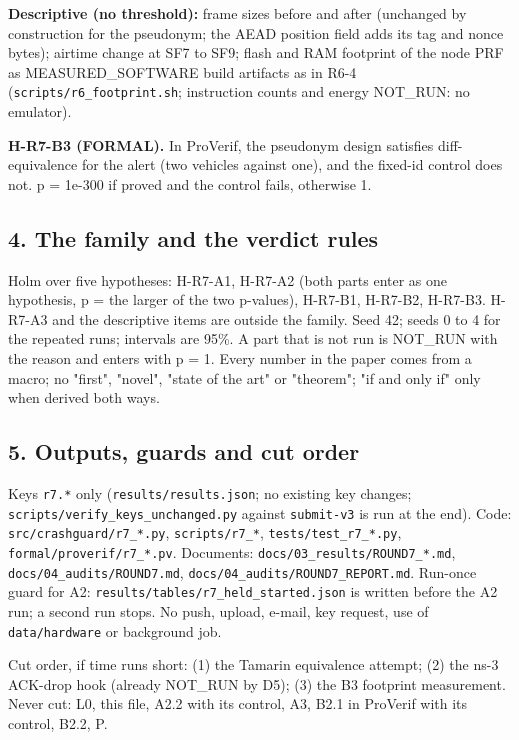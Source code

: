 \textbf{Descriptive (no threshold):} frame sizes before and after (unchanged by construction for the pseudonym; the AEAD position field adds its tag and nonce bytes); airtime change at SF7 to SF9; flash and RAM footprint of the node PRF as MEASURED\_SOFTWARE build artifacts as in R6-4 (\texttt{scripts/r6\_footprint.sh}; instruction counts and energy NOT\_RUN: no emulator).

\textbf{H-R7-B3 (FORMAL).} In ProVerif, the pseudonym design satisfies diff-equivalence for the alert (two vehicles against one), and the fixed-id control does not. p = 1e-300 if proved and the control fails, otherwise 1.

\subsection*{4. The family and the verdict rules}

Holm over five hypotheses: H-R7-A1, H-R7-A2 (both parts enter as one hypothesis, p = the larger of the two p-values), H-R7-B1, H-R7-B2, H-R7-B3. H-R7-A3 and the descriptive items are outside the family. Seed 42; seeds 0 to 4 for the repeated runs; intervals are 95\%. A part that is not run is NOT\_RUN with the reason and enters with p = 1. Every number in the paper comes from a macro; no "first", "novel", "state of the art" or "theorem"; "if and only if" only when derived both ways.

\subsection*{5. Outputs, guards and cut order}

Keys \texttt{r7.*} only (\texttt{results/results.json}; no existing key changes; \texttt{scripts/verify\_keys\_unchanged.py} against \texttt{submit-v3} is run at the end). Code: \texttt{src/crashguard/r7\_*.py}, \texttt{scripts/r7\_*}, \texttt{tests/test\_r7\_*.py}, \texttt{formal/proverif/r7\_*.pv}. Documents: \texttt{docs/03\_results/ROUND7\_*.md}, \texttt{docs/04\_audits/ROUND7.md}, \texttt{docs/04\_audits/ROUND7\_REPORT.md}. Run-once guard for A2: \texttt{results/tables/r7\_held\_started.json} is written before the A2 run; a second run stops. No push, upload, e-mail, key request, use of \texttt{data/hardware} or background job.

Cut order, if time runs short: (1) the Tamarin equivalence attempt; (2) the ns-3 ACK-drop hook (already NOT\_RUN by D5); (3) the B3 footprint measurement. Never cut: L0, this file, A2.2 with its control, A3, B2.1 in ProVerif with its control, B2.2, P.

